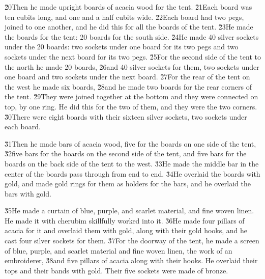 \v{20}Then he made upright boards of acacia wood for the tent. \v{21}Each board was ten cubits long, and one and a half cubits wide. \v{22}Each board had two pegs, joined to one another, and he did this for all the boards of the tent. \v{23}He made the boards for the tent: 20 boards for the south side. \v{24}He made 40 silver sockets under the 20 boards: two sockets under one board for its two pegs and two sockets under the next board for its two pegs. \v{25}For the second side of the tent to the north he made 20 boards, \v{26}and 40 silver sockets for them, two sockets under one board and two sockets under the next board. \v{27}For the rear of the tent on the west he made six boards, \v{28}and he made two boards for the rear corners of the tent. \v{29}They were joined together at the bottom and they were connected on top, by one ring. He did this for the two of them, and they were the two corners. \v{30}There were eight boards with their sixteen silver sockets, two sockets under each board.

\v{31}Then he made bars of acacia wood, five for the boards on one side of the tent, \v{32}five bars for the boards on the second side of the tent, and five bars for the boards on the back side of the tent to the west. \v{33}He made the middle bar in the center of the boards pass through from end to end. \v{34}He overlaid the boards with gold, and made gold rings for them as holders for the bars, and he overlaid the bars with gold.

\v{35}He made a curtain of blue, purple, and scarlet material, and fine woven linen. He made it with cherubim skillfully worked into it. \v{36}He made four pillars of acacia for it and overlaid them with gold, along with their gold hooks, and he cast four silver sockets for them. \v{37}For the doorway of the tent, he made a screen of blue, purple, and scarlet material and fine woven linen, the work of an embroiderer, \v{38}and five pillars of acacia along with their hooks. He overlaid their tops and their bands with gold. Their five sockets were made of bronze.

